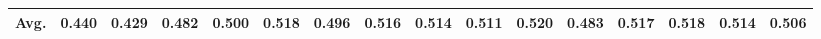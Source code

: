 \begin{table*}[h]
{\begin{tabular}{r r r lr  |lllll|llllll}
                \textbf{Avg.} & 0.440 & 0.429  &  0.482&0.500 & 0.518 &0.496&  0.516 & 0.514 & 0.511 & 0.520 &0.483 &0.517& 0.518 &0.514& 0.506 \\
            \hline\hline
		\end{tabular}
		}
	
 \vspace*{-5mm}
	\label{tab:beir}

\end{table*}



